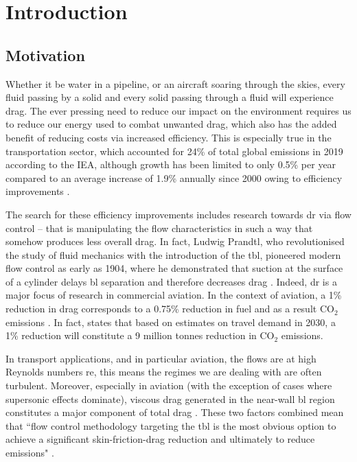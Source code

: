 \chapter{Introduction}
\section{Motivation}\label{sec:motivation}
Whether it be water in a pipeline, or an aircraft soaring through the skies, every fluid passing by a solid and every solid passing through a fluid will experience drag. The ever pressing need to reduce our impact on the environment requires us to reduce our energy used to combat unwanted drag, which also has the added benefit of reducing costs via increased efficiency. This is especially true in the transportation sector, which accounted for 24\% of total global emissions in 2019 according to the IEA, although growth has been limited to only 0.5\% per year compared to an average increase of 1.9\% annually since 2000 owing to efficiency improvements \cite{iea2021}.

The search for these efficiency improvements includes research towards \gls*{dr} via flow control -- that is manipulating the flow characteristics in such a way that somehow produces less overall drag. In fact, Ludwig Prandtl, who revolutionised the study of fluid mechanics with the introduction of the \gls*{tbl}, pioneered modern flow control as early as 1904, where he demonstrated that suction at the surface of a cylinder delays \gls*{bl} separation and therefore decreases drag \cite{gad-el-hak2001,prandtl1904}. Indeed, \gls*{dr} is a major focus of research in commercial aviation. In the context of aviation, a 1\% reduction in drag corresponds to a 0.75\% reduction in fuel and as a result \ensuremath{\mathrm{CO_2}} emissions \cite{leschziner2011}. In fact, \textcite{leschziner2011} states that based on estimates on travel demand in 2030, a 1\% reduction will constitute a 9 million tonnes reduction in \ensuremath{\mathrm{CO_2}} emissions.

In transport applications, and in particular aviation, the flows are at high Reynolds numbers \gls*{re}, this means the regimes we are dealing with are often turbulent. Moreover, especially in aviation (with the exception of cases where supersonic effects dominate), viscous drag generated in the near-wall \gls*{bl} region constitutes a major component of total drag \cite{abbas2017}. These two factors combined mean that ``flow control methodology targeting the \gls*{tbl} is the most obvious option to achieve a significant skin-friction-drag reduction and ultimately to reduce emissions" \cite{abbas2017}.

